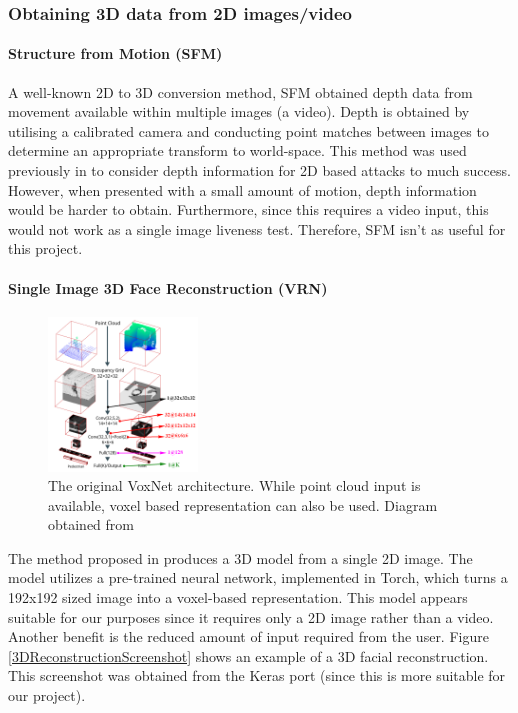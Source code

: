 \documentclass[12pt,a4paper]{article}
\begin{document}
        \cite{3DMadDataset}

        \subsubsection{Obtaining 3D data from 2D images/video}
            
            \paragraph{Structure from Motion (SFM)}
            A well-known 2D to 3D conversion method, SFM obtained depth data from movement available within multiple images (a video). Depth is obtained by utilising a calibrated camera and conducting point matches between images
            to determine an appropriate transform to world-space. This method was used previously in \cite{SFMClassifier} to consider depth information for 2D based attacks to much success.
            However, when presented with a small amount of motion, depth information would be harder to obtain. Furthermore, since this requires a video input, this would not work as a single image liveness test. Therefore, SFM isn't as useful for this project.
            
            \paragraph{Single Image 3D Face Reconstruction (VRN)}
            \begin{figure}
                \centering
                \includegraphics[width=150px]{VoxNetArchitecture.png}
                \caption{The original VoxNet architecture. While point cloud input is available, voxel based representation can also be used. Diagram obtained from \cite{VoxNetModel}}
                \label{OriginalVoxNetArchitecture}
            \end{figure}
            The method proposed in \cite{3DReconstructionMethod} produces a 3D model from a single 2D image. The model utilizes a pre-trained neural network, implemented in Torch, which turns a 192x192 sized image into a voxel-based representation.
            This model appears suitable for our purposes since it requires only a 2D image rather than a video. Another benefit is the reduced amount of input required from the user. Figure \ref{3DReconstructionScreenshot} shows an example of a 3D facial reconstruction. 
            This screenshot was obtained from the Keras port (since this is more suitable for our project).
            
\end{document}
